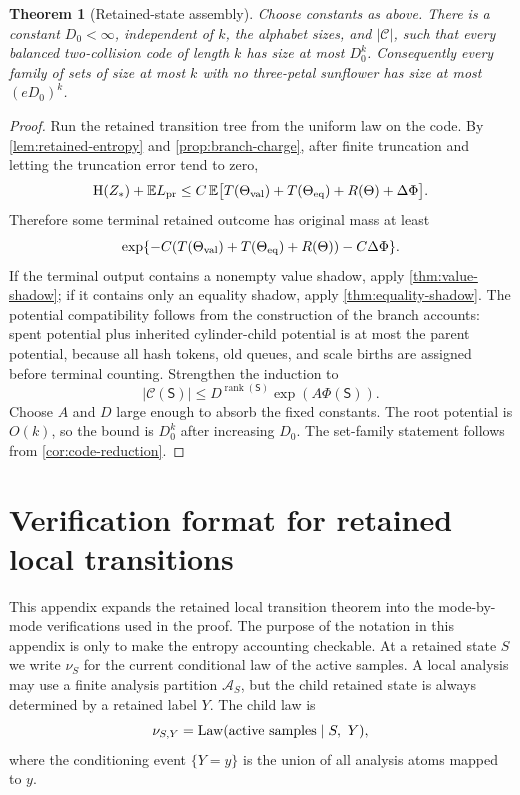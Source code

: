 \documentclass[11pt]{article}
\newcommand{\Cref}[1]{\ref{#1}}
\newtheorem{theorem}{Theorem}[section]
\theoremstyle{remark}
\newcommand{\C}{\mathcal C}
\newcommand{\E}{\mathbb E}
\newcommand{\HH}{\mathrm H}
\newcommand{\Law}{\operatorname{Law}}
\newcommand{\rank}{\operatorname{rank}}
\newcommand{\State}{\mathsf S}
\newcommand{\pr}{\mathrm{pr}}
\begin{document}
\begin{theorem}[Retained-state assembly]\label{thm:assembly}
Choose constants as above.  There is a constant $D_0<\infty$, independent of $k$, the alphabet sizes, and $|\C|$, such that every balanced two-collision code of length $k$ has size at most $D_0^k$.  Consequently every family of sets of size at most $k$ with no three-petal sunflower has size at most $(eD_0)^k$.
\end{theorem}

\begin{proof}
Run the retained transition tree from the uniform law on the code.  By \Cref{lem:retained-entropy} and \Cref{prop:branch-charge}, after finite truncation and letting the truncation error tend to zero,
\[
        \HH(Z_*)+\E L_{\pr}
        \le C\,\E\bigl[T(\Theta_{\rm val})+T(\Theta_{\rm eq})+R(\Theta)+\Delta\Phi\bigr].
\]
Therefore some terminal retained outcome has original mass at least
\[
        \exp\{-C(T(\Theta_{\rm val})+T(\Theta_{\rm eq})+R(\Theta))-C\Delta\Phi\}.
\]
If the terminal output contains a nonempty value shadow, apply \Cref{thm:value-shadow}; if it contains only an equality shadow, apply \Cref{thm:equality-shadow}.  The potential compatibility follows from the construction of the branch accounts: spent potential plus inherited cylinder-child potential is at most the parent potential, because all hash tokens, old queues, and scale births are assigned before terminal counting.  Strengthen the induction to
\[
        |\C(\State)|\le D^{\rank(\State)}\exp(A\Phi(\State)).
\]
Choose $A$ and $D$ large enough to absorb the fixed constants.  The root potential is $O(k)$, so the bound is $D_0^k$ after increasing $D_0$.  The set-family statement follows from \Cref{cor:code-reduction}.
\end{proof}



\appendix

\section{Verification format for retained local transitions}\label{app:verification-format}

This appendix expands the retained local transition theorem into the mode-by-mode verifications used in the proof.  The purpose of the notation in this appendix is only to make the entropy accounting checkable.  At a retained state $S$ we write $\nu_S$ for the current conditional law of the active samples.  A local analysis may use a finite analysis partition $\mathcal A_S$, but the child retained state is always determined by a retained label $Y$.  The child law is
\[
        \nu_{S,Y}=\Law(\hbox{active samples}\mid S,\ Y),
\]
where the conditioning event $\{Y=y\}$ is the union of all analysis atoms mapped to $y$.
\end{document}

